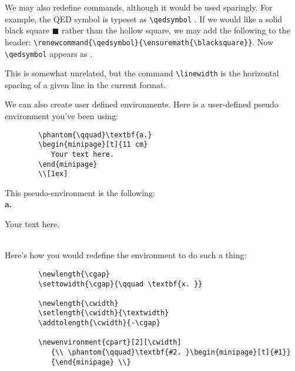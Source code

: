 \documentclass{amsart}
\begin{document}
	We may also redefine commands, although it would be used sparingly. 
	For example, the QED symbol is typeset as \verb+\qedsymbol+ \qedsymbol.
	If we would like a solid black square $\blacksquare$ rather than
	the hollow square, we may add the following to the header:
	\verb+\renewcommand{\qedsymbol}{\ensuremath{\blacksquare}}+.
	Now  \verb+\qedsymbol+ appears as \qedsymbol. 

	This is somewhat unrelated, but the command \verb+\linewidth+ is the 
	horizontal spacing of a given line in the current format. 

	We can also create user defined environments.
	Here is a user-defined pseudo environment you've been using:
	\begin{verbatim}
		\phantom{\qquad}\textbf{a.} 
		\begin{minipage}[t]{11 cm}
		   Your text here.
		\end{minipage}
		\\[1ex]
	\end{verbatim}
	This pseudo-environment is the following:\\
	\phantom{\qquad}\textbf{a.} 
	\begin{minipage}[t]{11 cm}
		Your text here.
	\end{minipage}
	\\[1ex]
	Here's how you would redefine the environment to do such a thing:
	\begin{verbatim}
		\newlength{\cgap}
		\settowidth{\cgap}{\qquad \textbf{x. }}

		\newlength{\cwidth}
		\setlength{\cwidth}{\textwidth}
		\addtolength{\cwidth}{-\cgap}

		\newenvironment{cpart}[2][\cwidth]
		   {\\ \phantom{\qquad}\textbf{#2. }\begin{minipage}[t]{#1}}
		   {\end{minipage} \\}
	\end{verbatim}
\end{document}
